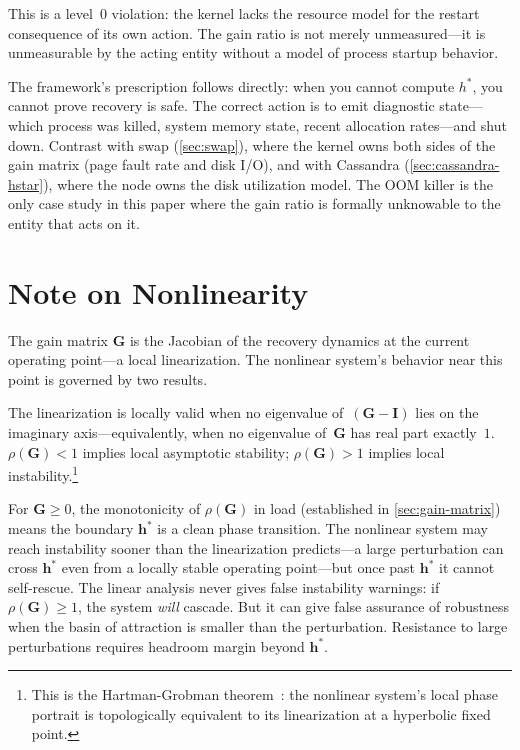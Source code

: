 \documentclass[11pt]{article}
\begin{document}
This is a level~0 violation: the kernel lacks the resource model for the restart
consequence of its own action. The gain ratio is not merely unmeasured---it is
unmeasurable by the acting entity without a model of process startup behavior.

The framework's prescription follows directly: when you cannot compute $h^*$,
you cannot prove recovery is safe. The correct action is to emit diagnostic
state---which process was killed, system memory state, recent allocation
rates---and shut down. Contrast with swap (\cref{sec:swap}), where the kernel
owns both sides of the gain matrix (page fault rate and disk I/O), and with
Cassandra (\cref{sec:cassandra-hstar}), where the node owns the disk
utilization model. The OOM killer is the only case study in this paper where the
gain ratio is formally unknowable to the entity that acts on it.

\section{Note on Nonlinearity}
\label{sec:nonlinearity}

The gain matrix $\mathbf{G}$ is the Jacobian of the recovery dynamics at the
current operating point---a local linearization. The nonlinear system's behavior
near this point is governed by two results.

The linearization is locally valid when no eigenvalue
of~$(\mathbf{G} - \mathbf{I})$ lies on the imaginary axis---equivalently, when
no eigenvalue of~$\mathbf{G}$ has real part exactly~$1$.
$\rho(\mathbf{G}) < 1$ implies local asymptotic stability;
$\rho(\mathbf{G}) > 1$ implies local
instability.\footnote{This is the Hartman-Grobman
theorem~\cite{hartman1960lemma,grobman1959homeomorphisms,hartman1960local}: the
nonlinear system's local phase portrait is topologically equivalent to its
linearization at a hyperbolic fixed point.}

For $\mathbf{G} \geq 0$, the monotonicity of $\rho(\mathbf{G})$ in load
(established in \cref{sec:gain-matrix}) means the boundary $\mathbf{h}^*$ is a
clean phase transition. The nonlinear system may reach instability sooner than
the linearization predicts---a large perturbation can cross $\mathbf{h}^*$ even
from a locally stable operating point---but once past $\mathbf{h}^*$ it cannot
self-rescue. The linear analysis never gives false instability warnings: if
$\rho(\mathbf{G}) \geq 1$, the system \emph{will} cascade. But it can give
false assurance of robustness when the basin of attraction is smaller than the
perturbation. Resistance to large perturbations requires headroom margin beyond
$\mathbf{h}^*$.
\end{document}
